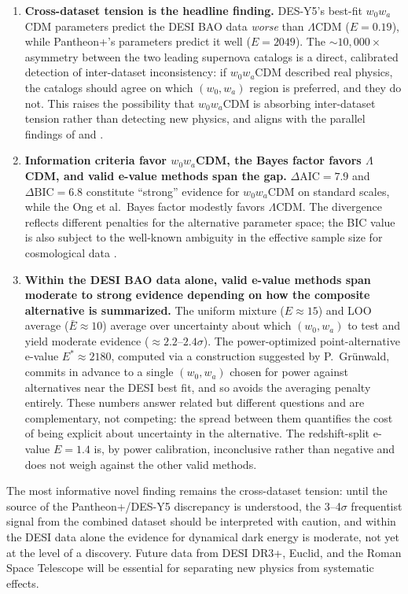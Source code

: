 \documentclass[11pt,a4paper]{article}
\newcommand{\LCDM}{$\Lambda$CDM}
\begin{document}
\begin{enumerate}
    \item \textbf{Cross-dataset tension is the headline finding.} DES-Y5's best-fit $w_0w_a$CDM parameters predict the DESI BAO data \emph{worse} than \LCDM{} ($E = 0.19$), while Pantheon+'s parameters predict it well ($E = 2049$). The ${\sim}10{,}000\times$ asymmetry between the two leading supernova catalogs is a direct, calibrated detection of inter-dataset inconsistency: if $w_0w_a$CDM described real physics, the catalogs should agree on which $(w_0, w_a)$ region is preferred, and they do not. This raises the possibility that $w_0w_a$CDM is absorbing inter-dataset tension rather than detecting new physics, and aligns with the parallel findings of \citet{OngBayesian2025} and \citet{WangMota2025}.

    \item \textbf{Information criteria favor $w_0w_a$CDM, the Bayes factor favors \LCDM, and valid e-value methods span the gap.} $\Delta\text{AIC} = 7.9$ and $\Delta\text{BIC} = 6.8$ constitute ``strong'' evidence for $w_0w_a$CDM on standard scales, while the Ong et al.\ Bayes factor modestly favors \LCDM. The divergence reflects different penalties for the alternative parameter space; the BIC value is also subject to the well-known ambiguity in the effective sample size for cosmological data \citep{Liddle2007}.

    \item \textbf{Within the DESI BAO data alone, valid e-value methods span moderate to strong evidence depending on how the composite alternative is summarized.} The uniform mixture ($E \approx 15$) and LOO average ($\bar{E} \approx 10$) average over uncertainty about which $(w_0, w_a)$ to test and yield moderate evidence ($\approx 2.2$--$2.4\sigma$). The power-optimized point-alternative e-value $E^{*} \approx 2180$, computed via a construction suggested by P.~Gr\"unwald, commits in advance to a single $(w_0, w_a)$ chosen for power against alternatives near the DESI best fit, and so avoids the averaging penalty entirely. These numbers answer related but different questions and are complementary, not competing: the spread between them quantifies the cost of being explicit about uncertainty in the alternative. The redshift-split e-value $E = 1.4$ is, by power calibration, inconclusive rather than negative and does not weigh against the other valid methods.
\end{enumerate}

The most informative novel finding remains the cross-dataset tension: until the source of the Pantheon+/DES-Y5 discrepancy is understood, the 3--4$\sigma$ frequentist signal from the combined dataset should be interpreted with caution, and within the DESI data alone the evidence for dynamical dark energy is moderate, not yet at the level of a discovery. Future data from DESI DR3+, Euclid, and the Roman Space Telescope will be essential for separating new physics from systematic effects.
\end{document}
